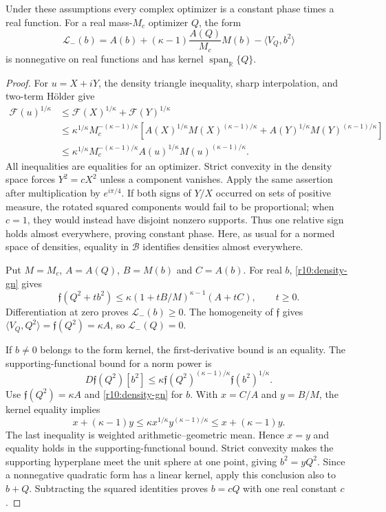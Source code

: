 \begin{lemma}
\label{lem:r10-density}
Under these assumptions every complex optimizer is a constant phase
times a real function. For a real mass-$M_c$ optimizer $Q$, the form
\[
 \mathcal L_-(b)=A(b)+(\kappa-1)\frac{A(Q)}{M_c}M(b)
                    -\langle V_Q,b^2\rangle
\]
is nonnegative on real functions and has kernel
$\operatorname{span}_{\mathbb R}\{Q\}$.
\end{lemma}
\begin{proof}
For $u=X+iY$, the density triangle inequality, sharp interpolation,
and two-term H\"older give
\begin{align*}
 \mathcal F(u)^{1/\kappa}
 &\le\mathcal F(X)^{1/\kappa}+\mathcal F(Y)^{1/\kappa}\\
 &\le \kappa^{1/\kappa}M_c^{-(\kappa-1)/\kappa}
  \left[A(X)^{1/\kappa}M(X)^{(\kappa-1)/\kappa}
       +A(Y)^{1/\kappa}M(Y)^{(\kappa-1)/\kappa}\right]\\
 &\le \kappa^{1/\kappa}M_c^{-(\kappa-1)/\kappa}
              A(u)^{1/\kappa}M(u)^{(\kappa-1)/\kappa}.
\end{align*}
All inequalities are equalities for an optimizer. Strict convexity
in the density space forces $Y^2=cX^2$ unless a component vanishes.
Apply the same assertion after multiplication by $e^{i\pi/4}$.
If both signs of $Y/X$ occurred on sets of positive measure, the
rotated squared components would fail to be proportional; when
$c=1$, they would instead have disjoint nonzero supports.
Thus one relative sign holds almost everywhere, proving constant
phase. Here, as usual for a normed space of densities, equality in
$\mathcal B$ identifies densities almost everywhere.

Put $M=M_c$, $A=A(Q)$, $B=M(b)$ and $C=A(b)$.
For real $b$, \eqref{r10:density-gn} gives
\[
 \mathfrak f(Q^2+tb^2)
 \le\kappa(1+tB/M)^{\kappa-1}(A+tC),\qquad t\ge0.
\]
Differentiation at zero proves $\mathcal L_-(b)\ge0$.
The homogeneity of $\mathfrak f$ gives
$\langle V_Q,Q^2\rangle=\mathfrak f(Q^2)=\kappa A$,
so $\mathcal L_-(Q)=0$.

If $b\ne0$ belongs to the form kernel, the first-derivative bound
is an equality. The supporting-functional bound for a norm power is
\[
 D\mathfrak f(Q^2)[b^2]
 \le\kappa\mathfrak f(Q^2)^{(\kappa-1)/\kappa}
                   \mathfrak f(b^2)^{1/\kappa}.
\]
Use $\mathfrak f(Q^2)=\kappa A$ and
\eqref{r10:density-gn} for $b$. With $x=C/A$ and $y=B/M$,
the kernel equality implies
\[
 x+(\kappa-1)y
 \le\kappa x^{1/\kappa}y^{(\kappa-1)/\kappa}
 \le x+(\kappa-1)y.
\]
The last inequality is weighted arithmetic--geometric mean.
Hence $x=y$ and equality holds in the supporting-functional bound.
Strict convexity makes the supporting hyperplane meet the unit
sphere at one point, giving $b^2=yQ^2$. Since a nonnegative
quadratic form has a linear kernel, apply this conclusion also to
$b+Q$. Subtracting the squared identities proves $b=cQ$ with one
real constant $c$.
\end{proof}

